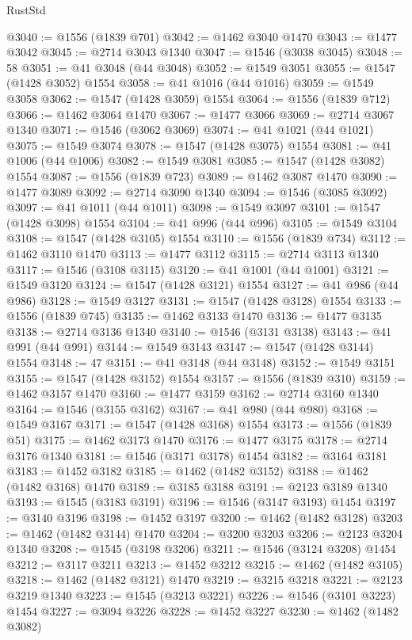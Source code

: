 \begin{lexlean}{RustStd}
\begin{coremodule}
@3040 := @1556 (@1839 @701)
@3042 := @1462 @3040 @1470
@3043 := @1477 @3042
@3045 := @2714 @3043 @1340
@3047 := @1546 (@3038 @3045)
@3048 := 58
@3051 := @41 @3048 (@44 @3048)
@3052 := @1549 @3051
@3055 := @1547 (@1428 @3052) @1554
@3058 := @41 @1016 (@44 @1016)
@3059 := @1549 @3058
@3062 := @1547 (@1428 @3059) @1554
@3064 := @1556 (@1839 @712)
@3066 := @1462 @3064 @1470
@3067 := @1477 @3066
@3069 := @2714 @3067 @1340
@3071 := @1546 (@3062 @3069)
@3074 := @41 @1021 (@44 @1021)
@3075 := @1549 @3074
@3078 := @1547 (@1428 @3075) @1554
@3081 := @41 @1006 (@44 @1006)
@3082 := @1549 @3081
@3085 := @1547 (@1428 @3082) @1554
@3087 := @1556 (@1839 @723)
@3089 := @1462 @3087 @1470
@3090 := @1477 @3089
@3092 := @2714 @3090 @1340
@3094 := @1546 (@3085 @3092)
@3097 := @41 @1011 (@44 @1011)
@3098 := @1549 @3097
@3101 := @1547 (@1428 @3098) @1554
@3104 := @41 @996 (@44 @996)
@3105 := @1549 @3104
@3108 := @1547 (@1428 @3105) @1554
@3110 := @1556 (@1839 @734)
@3112 := @1462 @3110 @1470
@3113 := @1477 @3112
@3115 := @2714 @3113 @1340
@3117 := @1546 (@3108 @3115)
@3120 := @41 @1001 (@44 @1001)
@3121 := @1549 @3120
@3124 := @1547 (@1428 @3121) @1554
@3127 := @41 @986 (@44 @986)
@3128 := @1549 @3127
@3131 := @1547 (@1428 @3128) @1554
@3133 := @1556 (@1839 @745)
@3135 := @1462 @3133 @1470
@3136 := @1477 @3135
@3138 := @2714 @3136 @1340
@3140 := @1546 (@3131 @3138)
@3143 := @41 @991 (@44 @991)
@3144 := @1549 @3143
@3147 := @1547 (@1428 @3144) @1554
@3148 := 47
@3151 := @41 @3148 (@44 @3148)
@3152 := @1549 @3151
@3155 := @1547 (@1428 @3152) @1554
@3157 := @1556 (@1839 @310)
@3159 := @1462 @3157 @1470
@3160 := @1477 @3159
@3162 := @2714 @3160 @1340
@3164 := @1546 (@3155 @3162)
@3167 := @41 @980 (@44 @980)
@3168 := @1549 @3167
@3171 := @1547 (@1428 @3168) @1554
@3173 := @1556 (@1839 @51)
@3175 := @1462 @3173 @1470
@3176 := @1477 @3175
@3178 := @2714 @3176 @1340
@3181 := @1546 (@3171 @3178) @1454
@3182 := @3164 @3181
@3183 := @1452 @3182
@3185 := @1462 (@1482 @3152)
@3188 := @1462 (@1482 @3168) @1470
@3189 := @3185 @3188
@3191 := @2123 @3189 @1340
@3193 := @1545 (@3183 @3191)
@3196 := @1546 (@3147 @3193) @1454
@3197 := @3140 @3196
@3198 := @1452 @3197
@3200 := @1462 (@1482 @3128)
@3203 := @1462 (@1482 @3144) @1470
@3204 := @3200 @3203
@3206 := @2123 @3204 @1340
@3208 := @1545 (@3198 @3206)
@3211 := @1546 (@3124 @3208) @1454
@3212 := @3117 @3211
@3213 := @1452 @3212
@3215 := @1462 (@1482 @3105)
@3218 := @1462 (@1482 @3121) @1470
@3219 := @3215 @3218
@3221 := @2123 @3219 @1340
@3223 := @1545 (@3213 @3221)
@3226 := @1546 (@3101 @3223) @1454
@3227 := @3094 @3226
@3228 := @1452 @3227
@3230 := @1462 (@1482 @3082)

\end{coremodule}
\end{lexlean}
